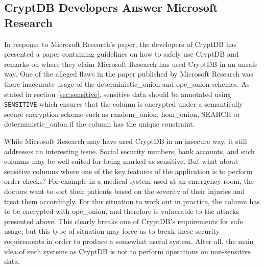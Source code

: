 \subsection{CryptDB Developers Answer Microsoft Research}

In response to Microsoft Research's paper, the developers of CryptDB has presented a paper containing guidelines \cite{cryptdb_guidelines} on how to safely use CryptDB and remarks on where they claim Microsoft Research has used CryptDB in an unsafe way. One of the alleged flaws in the paper published by Microsoft Research was there inaccurate usage of the \gls{deterministic_onion} and \gls{ope_onion} schemes. As stated in section \ref{sec:sensitive}, sensitive data should be annotated using \verb!SENSITIVE! which ensures that the column is encrypted under a semantically secure encryption scheme such as \gls{random_onion}, \gls{hom_onion}, SEARCH or \gls{deterministic_onion} if the column has the unique constraint. 

While Microsoft Research may have used CryptDB in an insecure way, it still addresses an interesting issue. Social security numbers, bank accounts, and such columns may be well suited for being marked as sensitive. But what about sensitive columns where one of the key features of the application is to perform order checks? For example in a medical system used at an emergency room, the doctors want to sort their patients based on the severity of their injuries and treat them accordingly. For this situation to work out in practice, the column has to be encrypted with \gls{ope_onion}, and therefore is vulnerable to the attacks presented above. This clearly breaks one of CryptDB's requirements for safe usage, but this type of situation may force us to break these security requirements in order to produce a somewhat useful system. After all, the main idea of such systems as CryptDB is not to perform operations on non-sensitive data.